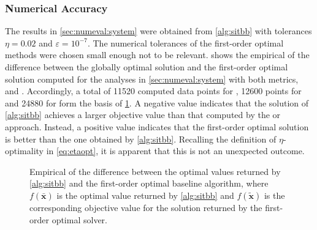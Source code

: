 \documentclass[a4paper,10pt,journal]{IEEEtran}
\let\vec\bm
\begin{document}
\subsubsection{Numerical Accuracy}
The results in \cref{sec:numeval:system} were obtained from \cref{alg:sitbb} with tolerances $\eta = 0.02$ and $\varepsilon = 10^{-7}$. The numerical tolerances of the first-order optimal methods were chosen small enough not to be relevant.  shows the empirical  of the difference between the globally optimal solution and the first-order optimal solution computed for the analyses in \cref{sec:numeval:system} with both metrics,  and . Accordingly, a total of \num{11520} computed data points for , \num{12600} points for  and \num{24880} for  form the basis of \cref{fig:cdf}. A negative value indicates that the solution of \cref{alg:sitbb} achieves a larger objective value than that computed by the  or  approach. Instead, a positive value indicates that the first-order optimal solution is better than the one obtained by \cref{alg:sitbb}. Recalling the definition of $\eta$-optimality in \cref{eq:etaopt}, it is apparent that this is not an unexpected outcome.

\begin{figure}%
	\centering
	\caption{Empirical  of the difference between the optimal values returned by \cref{alg:sitbb} and the first-order optimal baseline algorithm, where $f(\bar{\vec x})$ is the optimal value returned by \cref{alg:sitbb} and $f(\tilde{\vec x})$ is the corresponding objective value for the solution returned by the first-order optimal solver.}
	\label{fig:cdf}
\end{figure}
\end{document}
